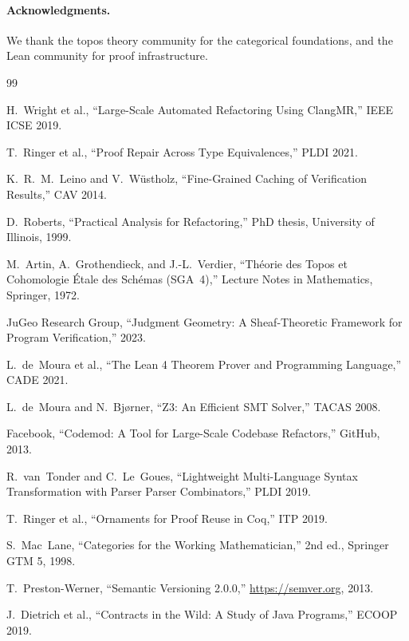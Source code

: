 \documentclass[11pt]{article}
\begin{document}
\paragraph{Acknowledgments.}
We thank the topos theory community for the categorical foundations, and
the Lean community for proof infrastructure.

\begin{thebibliography}{99}

H.~Wright et al., ``Large-Scale Automated Refactoring Using ClangMR,''
IEEE ICSE 2019.

T.~Ringer et al., ``Proof Repair Across Type Equivalences,''
PLDI 2021.

K.~R.~M.~Leino and V.~Wüstholz, ``Fine-Grained Caching of Verification
Results,'' CAV 2014.

D.~Roberts, ``Practical Analysis for Refactoring,'' PhD thesis, University
of Illinois, 1999.

M.~Artin, A.~Grothendieck, and J.-L.~Verdier, ``Th\'{e}orie des Topos et
Cohomologie \'{E}tale des Sch\'{e}mas (SGA~4),'' Lecture Notes in
Mathematics, Springer, 1972.

JuGeo Research Group, ``Judgment Geometry: A Sheaf-Theoretic Framework for
Program Verification,'' 2023.

L.~de~Moura et al., ``The Lean 4 Theorem Prover and Programming Language,''
CADE 2021.

L.~de~Moura and N.~Bjørner, ``Z3: An Efficient SMT Solver,'' TACAS 2008.

Facebook, ``Codemod: A Tool for Large-Scale Codebase Refactors,''
GitHub, 2013.

R.~van~Tonder and C.~Le~Goues, ``Lightweight Multi-Language Syntax
Transformation with Parser Parser Combinators,'' PLDI 2019.

T.~Ringer et al., ``Ornaments for Proof Reuse in Coq,'' ITP 2019.

S.~Mac~Lane, ``Categories for the Working Mathematician,'' 2nd ed.,
Springer GTM 5, 1998.

T.~Preston-Werner, ``Semantic Versioning 2.0.0,''
\url{https://semver.org}, 2013.

J.~Dietrich et al., ``Contracts in the Wild: A Study of Java Programs,''
ECOOP 2019.


\end{thebibliography}
\end{document}
